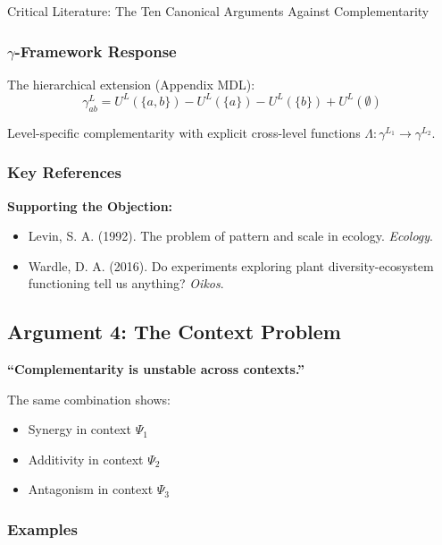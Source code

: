 \begin{chapter}{Critical Literature: The Ten Canonical Arguments Against Complementarity}
\subsubsection{$\gamma$-Framework Response}

The hierarchical extension (Appendix MDL):
\[
\gamma^L_{ab} = U^L(\{a,b\}) - U^L(\{a\}) - U^L(\{b\}) + U^L(\emptyset)
\]

Level-specific complementarity with explicit cross-level functions $\Lambda: \gamma^{L_1} \to \gamma^{L_2}$.

\subsubsection{Key References}

\textbf{Supporting the Objection:}
\begin{itemize}[noitemsep]
    \item Levin, S. A. (1992). The problem of pattern and scale in ecology. \textit{Ecology}.
    \item Wardle, D. A. (2016). Do experiments exploring plant diversity-ecosystem functioning tell us anything? \textit{Oikos}.
\end{itemize}

\subsection{Argument 4: The Context Problem}
\label{sec:arg-context}

\begin{tcolorbox}[colback=red!5!white,colframe=red!75!black,title=\textbf{Core Claim}]
\textbf{``Complementarity is unstable across contexts.''}

The same combination shows:
\begin{itemize}[noitemsep]
    \item Synergy in context $\Psi_1$
    \item Additivity in context $\Psi_2$
    \item Antagonism in context $\Psi_3$
\end{itemize}
\end{tcolorbox}

\subsubsection{Examples}


\end{chapter}
